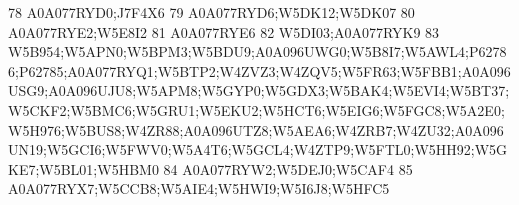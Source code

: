 \documentclass{beamer}
\begin{document}
\begin{frame}[fragile]
\begin{itemize}
\begin{Schunk}
\begin{Soutput}
78                                                                                                                                                                                                                                                                                                                                                              A0A077RYD0;J7F4X6
79                                                                                                                                                                                                                                                                                                                                                       A0A077RYD6;W5DK12;W5DK07
80                                                                                                                                                                                                                                                                                                                                                              A0A077RYE2;W5E8I2
81                                                                                                                                                                                                                                                                                                                                                                     A0A077RYE6
82                                                                                                                                                                                                                                                                                                                                                              W5DI03;A0A077RYK9
83 W5B954;W5APN0;W5BPM3;W5BDU9;A0A096UWG0;W5B8I7;W5AWL4;P62786;P62785;A0A077RYQ1;W5BTP2;W4ZVZ3;W4ZQV5;W5FR63;W5FBB1;A0A096USG9;A0A096UJU8;W5APM8;W5GYP0;W5GDX3;W5BAK4;W5EVI4;W5BT37;W5CKF2;W5BMC6;W5GRU1;W5EKU2;W5HCT6;W5EIG6;W5FGC8;W5A2E0;W5H976;W5BUS8;W4ZR88;A0A096UTZ8;W5AEA6;W4ZRB7;W4ZU32;A0A096UN19;W5GCI6;W5FWV0;W5A4T6;W5GCL4;W4ZTP9;W5FTL0;W5HH92;W5GKE7;W5BL01;W5HBM0
84                                                                                                                                                                                                                                                                                                                                                       A0A077RYW2;W5DEJ0;W5CAF4
85                                                                                                                                                                                                                                                                                                                                  A0A077RYX7;W5CCB8;W5AIE4;W5HWI9;W5I6J8;W5HFC5

\end{Soutput}
\end{Schunk}
\end{itemize}
\end{frame}
\end{document}
